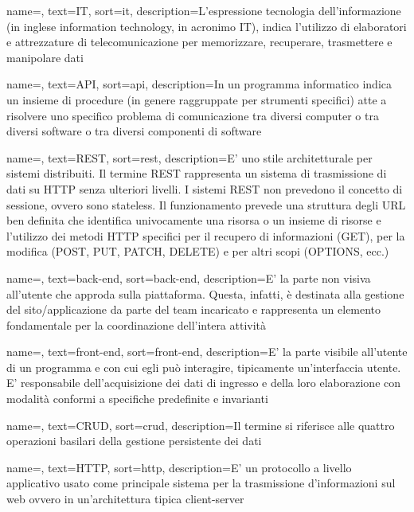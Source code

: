 {
    name=,
    text=IT,
    sort=it,
    description={L’espressione tecnologia dell’informazione (in inglese information technology, in acronimo IT), indica l’utilizzo di elaboratori e attrezzature di telecomunicazione per memorizzare, recuperare, trasmettere e manipolare dati}
}

{
    name=,
    text=API,
    sort=api,
    description={In un programma informatico indica un insieme di procedure (in genere raggruppate per strumenti specifici) atte a risolvere uno specifico problema di comunicazione tra diversi computer o tra diversi software o tra diversi componenti di software}
}

{
    name=,
    text=REST,
    sort=rest,
    description={E' uno stile architetturale per sistemi distribuiti. Il termine REST rappresenta un sistema di trasmissione di dati su HTTP senza ulteriori livelli. I sistemi REST non prevedono il concetto di sessione, ovvero sono stateless. Il funzionamento prevede una struttura degli URL ben definita che identifica univocamente una risorsa o un insieme di risorse e l'utilizzo dei metodi HTTP specifici per il recupero di informazioni (GET), per la modifica (POST, PUT, PATCH, DELETE) e per altri scopi (OPTIONS, ecc.)}
}

{
    name=,
    text=back-end,
    sort=back-end,
    description={E' la parte non visiva all’utente che approda sulla piattaforma. Questa, infatti, è destinata alla gestione del sito/applicazione da parte del team incaricato e rappresenta un elemento fondamentale per la coordinazione dell’intera attività}
}

{
    name=,
    text=front-end,
    sort=front-end,
    description={E' la parte visibile all'utente di un programma e con cui egli può interagire, tipicamente un'interfaccia utente. E' responsabile dell'acquisizione dei dati di ingresso e della loro elaborazione con modalità conformi a specifiche predefinite e invarianti}
}

{
    name=,
    text=CRUD,
    sort=crud,
    description={Il termine si riferisce alle quattro operazioni basilari della gestione persistente dei dati}
}

{
    name=,
    text=HTTP,
    sort=http,
    description={E' un protocollo a livello applicativo usato come principale sistema per la trasmissione d'informazioni sul web ovvero in un'architettura tipica client-server}
}


